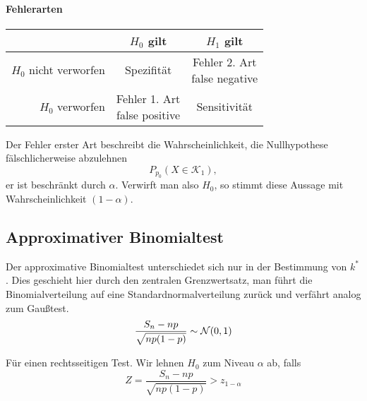 \paragraph{Fehlerarten}
\begin{center}
	\begin{tabular}{r|cc}
		&$H_0$ gilt&$H_1$ gilt\\\hline
		$H_0$ nicht verworfen&Spezifität&\makecell{Fehler 2. Art\\ false negative}\\
		$H_0$ verworfen&\makecell{Fehler 1. Art\\ false positive}&Sensitivität
	\end{tabular}
\end{center}
Der Fehler erster Art beschreibt die Wahrscheinlichkeit, die Nullhypothese fälschlicherweise abzulehnen
\begin{equation*}
	P_{p_0}(X\in \mathcal K_1),
\end{equation*}
er ist beschränkt durch $\alpha$. Verwirft man also $H_0$, so stimmt diese Aussage mit Wahrscheinlichkeit $(1-\alpha)$.


\subsection{Approximativer Binomialtest}
Der approximative Binomialtest unterschiedet sich nur in der Bestimmung von $k^\ast$. Dies geschieht hier durch den zentralen Grenzwertsatz, man führt die Binomialverteilung auf eine Standardnormalverteilung zurück und verfährt analog zum Gaußtest.
\begin{equation*}
	\frac{S_n-np}{\sqrt{np(1-p)}}\sim\mathcal{N}(0,1)
\end{equation*}

Für einen rechtsseitigen Test.
Wir lehnen $H_0$ zum Niveau $\alpha$ ab, falls
\begin{equation*}
	Z=\frac{S_n-np}{\sqrt{np(1-p)}}>z_{1-\alpha}
\end{equation*}

